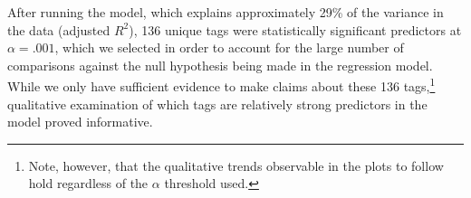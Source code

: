 
After running the model, which explains approximately 29\% of the variance in the data (adjusted $R^{2}$), 136 unique tags were statistically significant predictors at $\alpha =.001$, which we selected in order to account for the large number of comparisons against the null hypothesis being made in the regression model. While we only have sufficient evidence to make claims about these 136 tags,\footnote{Note, however, that the qualitative trends observable in the plots to follow hold regardless of the $\alpha$ threshold used.} qualitative examination of which tags are relatively strong predictors in the model proved informative.

